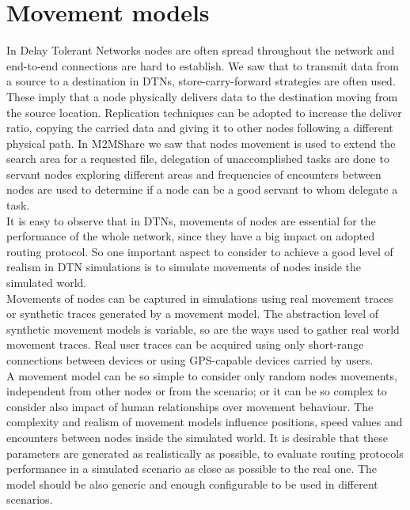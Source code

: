
\chapter{Movement models}\label{movimento} %





In Delay Tolerant Networks nodes are often spread throughout the network and end-to-end connections are hard to establish. We saw that to transmit data from a source to a destination in DTNs, store-carry-forward strategies are often used. These imply that a node physically delivers data to the destination moving from the source location. Replication techniques can be adopted to increase the deliver ratio, copying the carried data and giving it to other nodes following a different physical path. In M2MShare we saw that nodes movement is used to extend the search area for a requested file, delegation of unaccomplished tasks are done to servant nodes exploring different areas and frequencies of encounters between nodes are used to determine if a node can be a good servant to whom delegate a task.
\\

It is easy to observe that in DTNs, movements of nodes are essential for the performance of the whole network, since they have a big impact on adopted routing protocol. So one important aspect to consider to achieve a good level of realism in DTN simulations is to simulate movements of nodes inside the simulated world. 
\\

Movements of nodes can be captured in simulations using real movement traces or synthetic traces generated by a movement model. The abstraction level of synthetic movement models is variable, so are the ways used to gather real world movement traces. Real user traces can be acquired using only short-range connections between devices or using GPS-capable devices carried by users.
\\

A movement model can be so simple to consider only random nodes movements, independent from other nodes or from the scenario; or it can be so complex to consider also impact of human relationships over movement behaviour. The complexity and realism of movement models influence positions, speed values and encounters between nodes inside the simulated world. It is desirable that these parameters are generated as realistically as possible, to evaluate routing protocols performance in a simulated scenario as close as possible to the real one. The model should be also generic and enough configurable to be used in different scenarios.
\\

